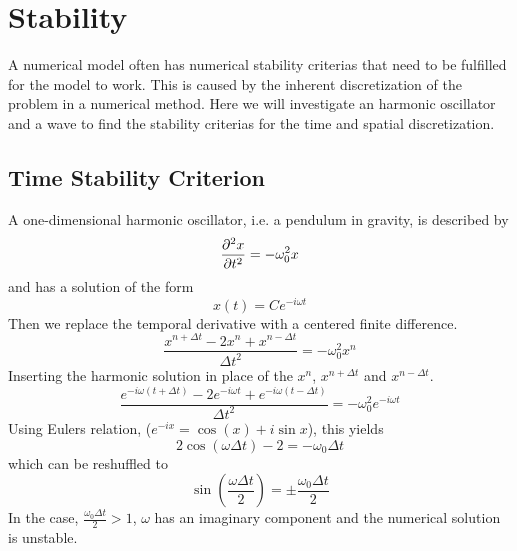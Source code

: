 \section{Stability}
    \label{sec:stability}
    A numerical model often has numerical stability criterias that need to be fulfilled
    for the model to work. This is caused by the inherent discretization of the problem
    in a numerical method. Here we will investigate an harmonic oscillator and a
    wave to find the stability criterias for the time and spatial discretization.

    \subsection{Time Stability Criterion}
        \label{sec:time_stability}
        A one-dimensional harmonic oscillator, i.e. a pendulum in gravity, is described by
        \begin{equation}
            \pdv[2]{x}{t} = - \omega_0^2 x
        \end{equation}
        and has a solution of the form
        \begin{equation}
            x(t) = C e^{-i\omega t} \label{eq:harmonic_sol}
        \end{equation}
        Then we replace the temporal derivative with a centered finite difference.
        \begin{equation}
            \frac{x^{n+\Delta t} - 2 x^{n} + x^{n-\Delta t}}{\Delta t^2} = -\omega_0^2 x^n
        \end{equation}
        Inserting the harmonic solution in place of the \(x^n\), \(x^{n+ \Delta t}\) and \(x^{n-\Delta t}\).
        \begin{equation}
            \frac{ e^{-i\omega (t + \Delta t)} -2e^{-i\omega t} + e^{-i\omega (t - \Delta t)}}{\Delta t^2} = -\omega_0^2 e^{-i\omega t}
        \end{equation}
        Using Eulers relation, (\(e^{-ix} = \cos(x) + i\sin{x}\)), this yields
        \begin{equation}
            2\cos(\omega \Delta t)- 2 = -\omega_0 \Delta t
        \end{equation}
        which can be reshuffled to
        \begin{equation}
                \sin(\frac{\omega \Delta t}{2}) = \pm \frac{\omega_0 \Delta t}{2}
        \end{equation}
        In the case, \(\frac{\omega_0 \Delta t}{2} > 1\), \(\omega\) has an imaginary component
        and the numerical solution is unstable.

